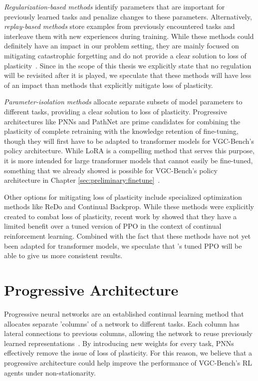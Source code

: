 \textit{Regularization-based methods} identify parameters that are important for previously learned tasks and penalize changes to these parameters.
Alternatively, \textit{replay-based methods} store examples from previously encountered tasks and interleave them with new experiences during training.
While these methods could definitely have an impact in our problem setting, they are mainly focused on mitigating catastrophic forgetting and do not provide a clear solution to loss of plasticity~\cite{wang2024cl}.
Since in the scope of this thesis we explicitly state that no regulation will be revisited after it is played, we speculate that these methods will have less of an impact than methods that explicitly mitigate loss of plasticity.

\textit{Parameter-isolation methods} allocate separate subsets of model parameters to different tasks, providing a clear solution to loss of plasticity.
Progressive architectures like PNNs and PathNet are prime candidates for combining the plasticity of complete retraining with the knowledge retention of fine-tuning, though they will first have to be adapted to transformer models for VGC-Bench's policy architecture.
While LoRA is a compelling method that serves this purpose, it is more intended for large transformer models that cannot easily be fine-tuned, something that we already showed is possible for VGC-Bench's policy architecture in Chapter \ref{sec:preliminary:finetune}~\cite{hu2022lora}.

Other options for mitigating loss of plasticity include  specialized optimization methods like ReDo and Continual Backprop.
While these methods were explicitly created to combat loss of plasticity, recent work by \textcite{dohare2024plasticity} showed that they have a limited benefit over a tuned version of PPO in the context of continual reinforcement learning.
Combined with the fact that these methods have not yet been adapted for transformer models, we speculate that \textcite{dohare2024plasticity}'s tuned PPO will be able to give us more consistent results.

\section{Progressive Architecture} \label{sec:progressive}
Progressive neural networks are an established continual learning method that allocates separate 'columns' of a network to different tasks.
Each column has lateral connections to previous columns, allowing the network to reuse previously learned representations~\cite{rusu2016pnn}.
By introducing new weights for every task, PNNs effectively remove the issue of loss of plasticity.
For this reason, we believe that a progressive architecture could help improve the performance of VGC-Bench's RL agents under non-stationarity.

